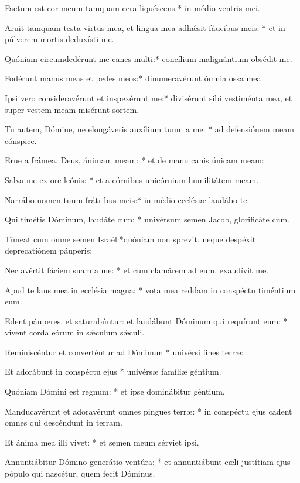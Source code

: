 Factum est cor meum tamquam cera liquéscens * in médio ventris mei.

{\color{blue!70}Aruit tamquam testa virtus mea, et lingua mea adhǽsit fáucibus meis: * et in
púlverem mortis deduxísti me.}

Quóniam circumdedérunt me canes multi:* concílium malignántium obsédit me.

{\color{blue!70}Fodérunt manus meas et pedes meos:* dinumeravérunt ómnia ossa mea.}

Ipsi vero consideravérunt et inspexérunt me:* divisérunt sibi vestiménta mea, et
super vestem meam misérunt sortem.

{\color{blue!70}Tu autem, Dómine, ne elongáveris auxílium tuum a me: * ad defensiónem meam
cónspice.}

Erue a frámea, Deus, ánimam meam: * et de manu canis únicam meam:

{\color{blue!70}Salva me ex ore leónis: * et a córnibus unicórnium humilitátem meam.}

Narrábo nomen tuum frátribus meis:* in médio ecclésiæ laudábo te.

{\color{blue!70}Qui timétis Dóminum, laudáte cum: * univérsum semen Jacob, glorificáte cum.}

Tímeat cum omne semen Israël:*quóniam non sprevit, neque despéxit deprecatiónem
páuperis:

{\color{blue!70}Nec avértit fáciem suam a me: * et cum clamárem ad eum, exaudívit me.}

Apud te laus mea in ecclésia magna: * vota mea reddam in conspéctu timéntium
eum.

{\color{blue!70}Edent páuperes, et saturabúntur: et laudábunt Dóminum qui requírunt eum: *
vivent corda eórum in sǽculum sǽculi.}

Reminiscéntur et converténtur ad Dóminum * univérsi fines terræ:

{\color{blue!70}Et adorábunt in conspéctu ejus * univérsæ famíliæ géntium.}

Quóniam Dómini est regnum: * et ipse dominábitur géntium.

{\color{blue!70}Manducavérunt et adoravérunt omnes pingues terræ: * in conspéctu ejus cadent
omnes qui descéndunt in terram.}

Et ánima mea illi vivet: * et semen meum sérviet ipsi.

{\color{blue!70}Annuntiábitur Dómino generátio ventúra: * et annuntiábunt cæli justítiam ejus
pópulo qui nascétur, quem fecit Dóminus.}


